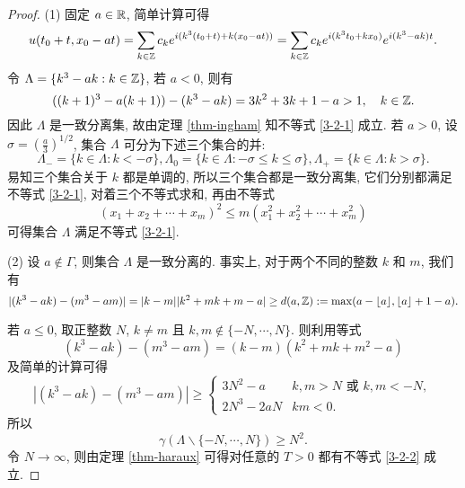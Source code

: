     \begin{proof}
     (1) 固定 $a\in\mathbb{R}$, 简单计算可得
     \begin{equation}\label{3-2-4}
         u(t_0+t,x_0-at)=\sum_{k\in \mathbb{Z}} c_k e^{i(k^3(t_0+t)+k(x_0-at))}=\sum_{k\in \mathbb{Z}}c_k  e^{i (k^3t_0+kx_0)} e^{i(k^3-ak)t}.
     \end{equation}
    令 $\Lambda=\lbrace k^3-ak: k\in \mathbb{Z}\rbrace$, 若 $a<0$, 则有
    \begin{equation*}
        ((k+1)^3-a(k+1))-(k^3-ak)=3k^2+3k+1-a>1,\quad k\in \mathbb{Z}.
    \end{equation*}
    因此 $\Lambda$ 是一致分离集, 故由定理 \ref{thm-ingham} 知不等式 \eqref{3-2-1} 成立. 若 $a>0$, 设 $\sigma=\left(\frac{a}{3}\right)^{1 /2}$, 集合 $\Lambda$ 可分为下述三个集合的并:
    \begin{equation*}
        \Lambda_-=\lbrace k\in \Lambda : k<-\sigma\rbrace, \Lambda_0=\lbrace k\in \Lambda : -\sigma\le k\le \sigma\rbrace,\Lambda_+=\lbrace k\in\Lambda: k>\sigma\rbrace.
    \end{equation*}
    易知三个集合关于 $k$ 都是单调的, 所以三个集合都是一致分离集, 它们分别都满足不等式 \eqref{3-2-1}, 对着三个不等式求和, 再由不等式
    \begin{equation*}
        (x_1+x_2+\cdots+x_m)^2\le m (x_1^2+x_2^2+\cdots+x_m^2)
    \end{equation*}
    可得集合 $\Lambda$ 满足不等式 \eqref{3-2-1}.
    
    (2) 设 $a\notin \Gamma$, 则集合 $\Lambda$ 是一致分离的. 事实上, 对于两个不同的整数 $k$ 和 $m$, 我们有
    \begin{equation*}
        |(k^3-ak)-(m^3-am)|=|k-m||k^2+mk+m-a|\ge d(a,\mathbb{Z}):=\max(a-\lfloor a\rfloor,\lfloor a\rfloor +1-a). 
    \end{equation*}
    
    若 $a\le 0$, 取正整数 $N$, $k\neq m$ 且 $k,m\notin\lbrace-N,\cdots, N\rbrace$. 则利用等式
    \begin{equation*}
        (k^3-ak)-(m^3-am)=(k-m)(k^2+mk+m^2-a)
    \end{equation*}
    及简单的计算可得
    \begin{equation}\label{3-22-3}
        \left| (k^3-ak)-(m^3-am) \right|\ge \left\lbrace\begin{array}{ll}
            3N^2-a & k,m> N \text{ 或 } k,m <-N, \\
             2N^3-2aN  & km<0.
        \end{array}\right.
    \end{equation}
    所以
    \begin{equation*}
        \gamma\left(\Lambda \backslash \lbrace-N,\cdots,N\rbrace\right)\ge N^2.
    \end{equation*}
    令 $N\to \infty$, 则由定理 \ref{thm-haraux} 可得对任意的 $T>0$ 都有不等式 \eqref{3-2-2} 成立.
    

\end{proof}
